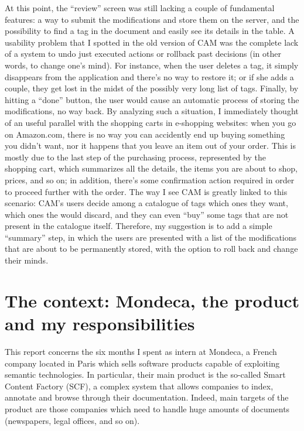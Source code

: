 \documentclass[12pt,svgnames]{memoir}
\begin{document}
At this point, the ``review'' screen was still lacking a couple of
fundamental features: a way to submit the modifications and store them
on the server, and the possibility to find a tag in the document and
easily see its details in the table. A usability problem that I spotted
in the old version of CAM was the complete lack of a system to undo just
executed actions or rollback past decisions (in other words, to change
one's mind). For instance, when the user deletes a tag, it simply
disappears from the application and there's no way to restore it; or if
she adds a couple, they get lost in the midst of the possibly very long
list of tags. Finally, by hitting a ``done'' button, the user would
cause an automatic process of storing the modifications, no way back. By
analyzing such a situation, I immediately thought of an useful parallel
with the shopping carts in e-shopping websites: when you go on
Amazon.com, there is no way you can accidently end up buying something
you didn't want, nor it happens that you leave an item out of your
order. This is mostly due to the last step of the purchasing process,
represented by the shopping cart, which summarizes all the details, the
items you are about to shop, prices, and so on; in addition, there's
some confirmation action required in order to proceed further with the
order. The way I see CAM is greatly linked to this scenario: CAM's users
decide among a catalogue of tags which ones they want, which ones the
would discard, and they can even ``buy'' some tags that are not present
in the catalogue itself. Therefore, my suggestion is to add a simple
``summary'' step, in which the users are presented with a list of the
modifications that are about to be permanently stored, with the option
to roll back and change their minds.

\chapter{The context: Mondeca, the product and my
responsibilities}\label{the-context-mondeca-the-product-and-my-responsibilities}

This report concerns the six months I spent as intern at Mondeca, a
French company located in Paris which sells software products capable of
exploiting semantic technologies. In particular, their main product is
the so-called Smart Content Factory (SCF), a complex system that allows
companies to index, annotate and browse through their documentation.
Indeed, main targets of the product are those companies which need to
handle huge amounts of documents (newspapers, legal offices, and so on).
\end{document}
